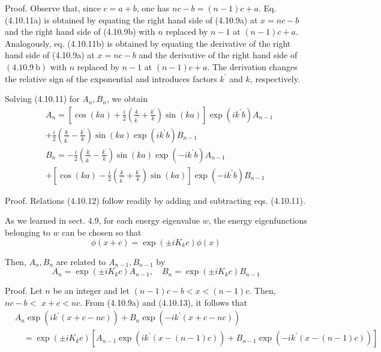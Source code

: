 \documentclass{article}
\begin{document}
Proof. Observe that, since $c=a+b$, one has $n c-b=(n-1) c+a$. Eq. (4.10.11a) is obtained by equating the right hand side of (4.10.9a) at $x=n c-b$ and the right hand side of (4.10.9b) with $n$ replaced by $n-1$ at $(n-1) c+a$. Analogously, eq. (4.10.11b) is obtained by equating the derivative of the right hand side of (4.10.9a) at $x=n c-b$ and the derivative of the right hand side of $(4.10 .9 \mathrm{~b})$ with $n$ replaced by $n-1$ at $(n-1) c+a$. The derivation changes the relative sign of the exponential and introduces factors $k^{\prime}$ and $k$, respectively.

Solving (4.10.11) for $A_{n}, B_{n}$, we obtain
$$
\begin{align*}
& A_{n}=\left[\cos (k a)+\frac{i}{2}\left(\frac{k}{k^{\prime}}+\frac{k^{\prime}}{k}\right) \sin (k a)\right] \exp \left(i k^{\prime} b\right) A_{n-1}  \tag{4.10.12a}\\
& +\frac{i}{2}\left(\frac{k}{k^{\prime}}-\frac{k^{\prime}}{k}\right) \sin (k a) \exp \left(i k^{\prime} b\right) B_{n-1} \\
& B_{n}=-\frac{i}{2}\left(\frac{k}{k^{\prime}}-\frac{k^{\prime}}{k}\right) \sin (k a) \exp \left(-i k^{\prime} b\right) A_{n-1}  \tag{4.10.12b}\\
& +\left[\cos (k a)-\frac{i}{2}\left(\frac{k}{k^{\prime}}+\frac{k^{\prime}}{k}\right) \sin (k a)\right] \exp \left(-i k^{\prime} b\right) B_{n-1}
\end{align*}
$$

Proof. Relations (4.10.12) follow readily by adding and subtracting eqs. (4.10.11).

As we learned in sect. 4.9, for each energy eigenvalue $w$, the energy eigenfunctions belonging to $w$ can be chosen so that
$$
\begin{equation*}
\phi(x+c)=\exp \left( \pm i K_{k} c\right) \phi(x) \tag{4.10.13}
\end{equation*}
$$

Then, $A_{n}, B_{n}$ are related to $A_{n-1}, B_{n-1}$ by
$$
\begin{equation*}
A_{n}=\exp \left( \pm i K_{k} c\right) A_{n-1}, \quad B_{n}=\exp \left( \pm i K_{k} c\right) B_{n-1} \tag{4.10.14}
\end{equation*}
$$

Proof. Let $n$ be an integer and let $(n-1) c-b<x<(n-1) c$. Then, $n c-b<$ $x+c<n c$. From (4.10.9a) and (4.10.13), it follows that
$$
\begin{align*}
& A_{n} \exp \left(i k^{\prime}(x+c-n c)\right)+B_{n} \exp \left(-i k^{\prime}(x+c-n c)\right)  \tag{4.10.15}\\
& \quad=\exp \left( \pm i K_{k} c\right)\left[A_{n-1} \exp \left(i k^{\prime}(x-(n-1) c)\right)+B_{n-1} \exp \left(-i k^{\prime}(x-(n-1) c)\right)\right]
\end{align*}
$$
\end{document}

